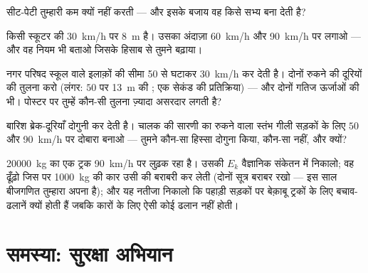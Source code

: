 \begin{exercise}[$\star$]\label{exo:g9:kinetic-energy-safety:8}
सीट-पेटी तुम्हारी  कम क्यों नहीं करती --- और इसके बजाय वह
किसे सभ्य बना देती है?
\end{exercise}

\begin{exercise}[$\star\star$]\label{exo:g9:kinetic-energy-safety:9}
किसी स्कूटर की  \qty{30}{km/h} पर \qty{8}{m} है। उसका
अंदाज़ा \qty{60}{km/h} और \qty{90}{km/h} पर लगाओ --- और वह नियम भी
बताओ जिसके हिसाब से तुमने बढ़ाया।
\end{exercise}

\begin{exercise}[$\star\star$]\label{exo:g9:kinetic-energy-safety:10}
नगर परिषद स्कूल वाले इलाक़ों की सीमा \qty{50}{} से घटाकर
\qty{30}{km/h} कर देती है। दोनों रुकने की दूरियों की तुलना करो (लंगर:
$50$ पर \qty{13}{m} की ; एक सेकंड की प्रतिक्रिया) --- और
दोनों गतिज ऊर्जाओं की भी। पोस्टर पर तुम्हें कौन-सी तुलना ज़्यादा असरदार
लगती है?
\end{exercise}

\begin{exercise}[$\star\star$]\label{exo:g9:kinetic-energy-safety:11}
बारिश ब्रेक-दूरियाँ दोगुनी कर देती है। चालक की सारणी का रुकने वाला
स्तंभ गीली सड़कों के लिए $50$ और \qty{90}{km/h} पर दोबारा बनाओ ---
तुमने कौन-सा हिस्सा दोगुना किया, कौन-सा नहीं, और क्यों?
\end{exercise}

\begin{exercise}[$\star\star\star$]\label{exo:g9:kinetic-energy-safety:12}
\qty{20000}{kg} का एक ट्रक \qty{90}{km/h} पर लुढ़क रहा है। उसकी $E_k$
वैज्ञानिक संकेतन में निकालो; वह  ढूँढ़ो जिस पर \qty{1000}{kg} की कार
उसी  की बराबरी कर लेती (दोनों सूत्र बराबर रखो --- इस साल बीजगणित
तुम्हारा अपना है); और यह नतीजा निकालो कि पहाड़ी सड़कों पर बेक़ाबू ट्रकों
के लिए बचाव-ढलानें क्यों होती हैं जबकि कारों के लिए ऐसी कोई ढलान नहीं
होती।
\end{exercise}

\section{समस्या: सुरक्षा अभियान}

